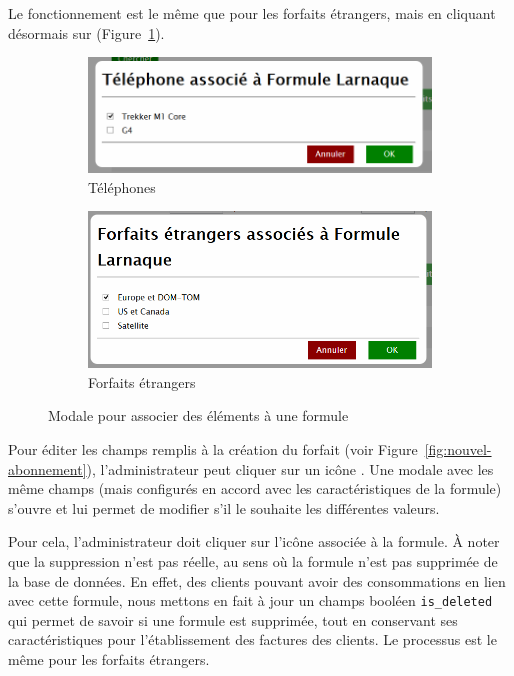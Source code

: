 Le fonctionnement est le même que pour les forfaits étrangers, mais en cliquant désormais sur \faMobilePhone{} (Figure~\ref{fig:assoc-telephone}).

\begin{figure}[ht]
  \centering
  \begin{subfigure}{.57\textwidth}
    \centering
    \includegraphics[width=\textwidth]{images/Plateforme/assoc_telephone}
    \caption{Téléphones}
    \label{fig:assoc-telephone}
  \end{subfigure}\hfill%
  \begin{subfigure}{.4\textwidth}
    \centering
    \includegraphics[width=\textwidth]{images/Plateforme/assoc_foreign}
    \caption{Forfaits étrangers}
    \label{fig:assoc-foreign}
  \end{subfigure}
  \caption{Modale pour associer des éléments à une formule}
\end{figure}

Pour éditer les champs remplis à la création du forfait (voir Figure~\ref{fig:nouvel-abonnement}), l'administrateur peut cliquer sur un icône \vColor{\faEdit}. Une modale avec les même champs (mais configurés en accord avec les caractéristiques de la formule) s'ouvre et lui permet de modifier s'il le souhaite les différentes valeurs.

Pour cela, l'administrateur doit cliquer sur l'icône \thColor{\faRemove} associée à la formule. À noter que la suppression n'est pas  réelle\fg, au sens où la formule n'est pas supprimée de la base de données. En effet, des clients pouvant avoir des consommations en lien avec cette formule, nous mettons en fait à jour un champs booléen \texttt{is\_deleted} qui permet de savoir si une formule est supprimée, tout en conservant ses caractéristiques pour l'établissement des factures des clients. Le processus est le même pour les forfaits étrangers.

